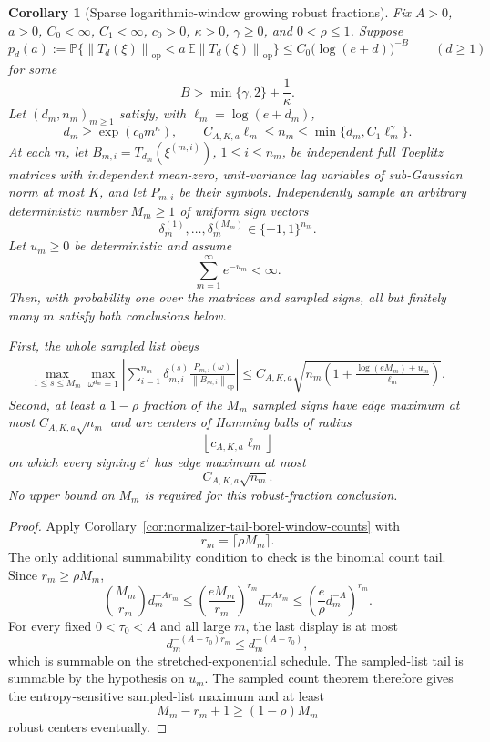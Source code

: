 \documentclass[11pt]{amsart}
\numberwithin{equation}{section}
\newtheorem{corollary}[theorem]{Corollary}
\theoremstyle{definition}
\theoremstyle{remark}
\newcommand{\op}{\mathrm{op}}
\newcommand{\Prob}{\mathbb P}
\newcommand{\Exp}{\mathbb E}
\newcommand{\norm}[1]{\left\lVert #1\right\rVert}
\newcommand{\eps}{\varepsilon}
\begin{document}
\begin{corollary}[Sparse logarithmic-window growing robust fractions]
\label{cor:normalizer-tail-borel-window-growing-fractions}
Fix \(A>0\), \(a>0\), \(C_0<\infty\), \(C_1<\infty\), \(c_0>0\),
\(\kappa>0\), \(\gamma\ge0\), and \(0<\rho\le1\).  Suppose
\[
  p_d(a):=\Prob\{\norm{T_d(\xi)}_{\op}<a\,\Exp\norm{T_d(\xi)}_{\op}\}
  \le C_0\bigl(\log(e+d)\bigr)^{-B}
  \qquad(d\ge1)
\]
for some
\[
  B>\min\{\gamma,2\}+\frac1\kappa .
\]
Let \((d_m,n_m)_{m\ge1}\) satisfy, with \(\ell_m=\log(e+d_m)\),
\[
  d_m\ge\exp(c_0m^\kappa),\qquad
  C_{A,K,a}\ell_m\le n_m\le \min\{d_m,C_1\ell_m^\gamma\}.
\]
At each \(m\), let \(B_{m,i}=T_{d_m}(\xi^{(m,i)})\), \(1\le i\le n_m\), be
independent full Toeplitz matrices with independent mean-zero, unit-variance lag
variables of sub-Gaussian norm at most \(K\), and let \(P_{m,i}\) be their
symbols.  Independently sample an arbitrary deterministic number \(M_m\ge1\) of
uniform sign vectors
\[
  \delta_m^{(1)},\ldots,\delta_m^{(M_m)}\in\{-1,1\}^{n_m}.
\]
Let \(u_m\ge0\) be deterministic and assume
\[
  \sum_{m=1}^{\infty}e^{-u_m}<\infty .
\]
Then, with probability one over the matrices and sampled signs, all but
finitely many \(m\) satisfy both conclusions below.

First, the whole sampled list obeys
\[
\begin{aligned}
  \max_{1\le s\le M_m}\max_{\omega^{d_m}=1}
  \left|\sum_{i=1}^{n_m}\delta_{m,i}^{(s)}
  \frac{P_{m,i}(\omega)}{\norm{B_{m,i}}_{\op}}\right|
  \le
  C_{A,K,a}\sqrt{
    n_m\left(1+\frac{\log(eM_m)+u_m}{\ell_m}\right)} .
\end{aligned}
\]
Second, at least a \(1-\rho\) fraction of the \(M_m\) sampled signs have edge
maximum at most \(C_{A,K,a}\sqrt{n_m}\) and are centers of Hamming balls of
radius
\[
  \left\lfloor c_{A,K,a}\ell_m\right\rfloor
\]
on which every signing \(\eps'\) has edge maximum at most
\[
  C_{A,K,a}\sqrt{n_m}.
\]
No upper bound on \(M_m\) is required for this robust-fraction conclusion.
\end{corollary}

\begin{proof}
Apply Corollary~\ref{cor:normalizer-tail-borel-window-counts} with
\[
  r_m=\lceil\rho M_m\rceil .
\]
The only additional summability condition to check is the binomial count tail.
Since \(r_m\ge\rho M_m\),
\[
  \binom{M_m}{r_m}d_m^{-A r_m}
  \le \left(\frac{eM_m}{r_m}\right)^{r_m}d_m^{-A r_m}
  \le \left(\frac{e}{\rho}d_m^{-A}\right)^{r_m}.
\]
For every fixed \(0<\tau_0<A\) and all large \(m\), the last display is at most
\[
  d_m^{-(A-\tau_0)r_m}\le d_m^{-(A-\tau_0)},
\]
which is summable on the stretched-exponential schedule.
The sampled-list tail is summable by the hypothesis on \(u_m\).  The sampled
count theorem therefore gives the entropy-sensitive sampled-list maximum and at
least
\[
  M_m-r_m+1\ge (1-\rho)M_m
\]
robust centers eventually.
\end{proof}
\end{document}
